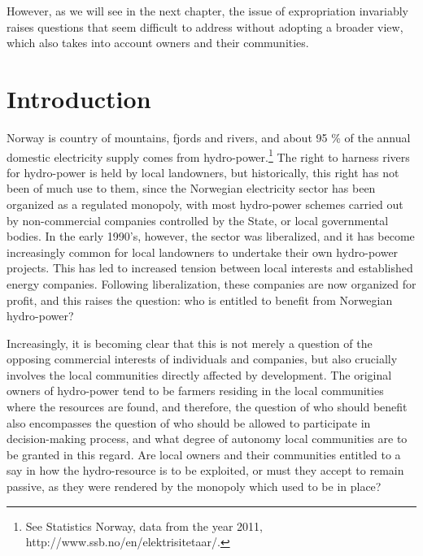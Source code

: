 However, as we will see in the next chapter, the issue of expropriation invariably raises questions that seem difficult to address without adopting a broader view, which also takes into account owners and their communities.

\section{Introduction}\label{intro}

Norway is country of mountains, fjords and rivers, and about 95 \% of the annual domestic electricity supply comes from hydro-power.\footnote{See Statistics Norway, data from the year 2011, http://www.ssb.no/en/elektrisitetaar/.} The right to harness rivers for hydro-power is held by local landowners, but historically, this right has not been of much use to them, since the Norwegian electricity sector has been organized as a regulated monopoly, with most hydro-power schemes carried out by non-commercial companies controlled by the State, or local governmental bodies. In the early 1990's, however, the sector was liberalized, and it has become increasingly common for local landowners to undertake their own hydro-power projects. This has led to increased tension between local interests and established energy companies. Following liberalization, these companies are now organized for profit, and this raises the question: who is entitled to benefit from Norwegian hydro-power? 

Increasingly, it is becoming clear that this is not merely a question of the opposing commercial interests of individuals and companies, but also crucially involves the local communities directly affected by development. The original owners of hydro-power tend to be farmers residing in the local communities where the resources are found, and therefore, the question of who should benefit also encompasses the question of who should be allowed to participate in decision-making process, and what degree of autonomy local communities are to be granted in this regard. Are local owners and their communities entitled to a say in how the hydro-resource is to be exploited, or must they accept to remain passive, as they were rendered by the monopoly which used to be in place?

